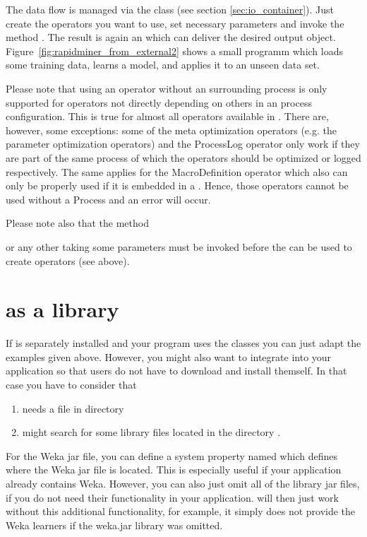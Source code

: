 The data flow is managed via the class  (see section
\ref{sec:io_container}). Just create the operators you want to use, set
necessary parameters and invoke the method . 
The result is again an  which can deliver the desired output
object. Figure~\ref{fig:rapidminer_from_external2} shows a small programm which loads
some training data, learns a model, and applies it to an unseen data set.


Please note that using an operator without an surrounding process is only
supported for operators not directly depending on others in an process
configuration. This is true for almost all operators available in \rapidminer. There
are, however, some exceptions: some of the meta optimization operators (e.g. 
the parameter optimization operators) and the ProcessLog operator only work
if they are part of the same process of which the operators should be optimized 
or logged respectively. The same applies for the MacroDefinition operator which
also can only be properly used if it is embedded in a . Hence, 
those operators cannot be used without a Process and an error will occur.

Please note also that the method 
\begin{center}
\end{center}
or any other  taking some parameters must be invoked before the 
 can be used to create operators (see above).


\section{\rapidminer as a library}

If \rapidminer is separately installed and your program uses the \rapidminer classes
you can just adapt the examples given above. However, you might also want
to integrate \rapidminer into your application so that users do not have to download
and install \rapidminer themself. In that case you have to consider that
\begin{enumerate}
\item \rapidminer needs a  file in 
  directory
\item \rapidminer might search for some library files located in the directory
  .
\end{enumerate}
For the Weka jar file, you can define a
system property named  which defines where the Weka jar
file is located. This is especially useful if your application already
contains Weka. However, you can also just omit all of the library jar files,
if you do not need their functionality in your application. 
\rapidminer will then just work without this additional functionality, for example,
it simply does not provide the Weka learners if the weka.jar library was omitted.



